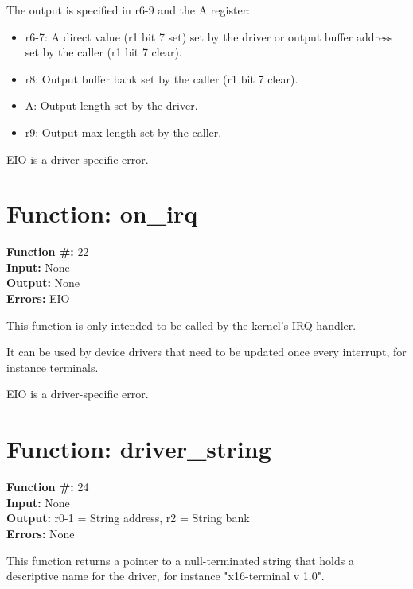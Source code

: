 The output is specified in r6-9 and the A register:

\begin{itemize}
    \item r6-7: A direct value (r1 bit 7 set) set by the driver or output buffer address set by the caller (r1 bit 7 clear).
    \item r8: Output buffer bank set by the caller (r1 bit 7 clear).
    \item A: Output length set by the driver.
    \item r9: Output max length set by the caller.
\end{itemize}

EIO is a driver-specific error.


\section{Function: on\_irq}

\textbf{Function \#:} 22 \\
\textbf{Input:} None \\
\textbf{Output:} None \\
\textbf{Errors:} EIO

This function is only intended to be called by the kernel's
IRQ handler.

It can be used by device drivers that need to be updated
once every interrupt, for instance terminals.

EIO is a driver-specific error.


\section{Function: driver\_string}

\textbf{Function \#:} 24 \\
\textbf{Input:} None \\
\textbf{Output:} r0-1 = String address, r2 = String bank \\
\textbf{Errors:} None

This function returns a pointer to a null-terminated string
that holds a descriptive name for the driver, for instance
"x16-terminal v 1.0".
